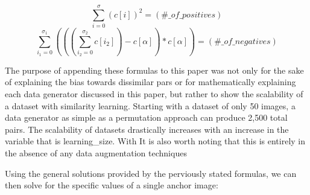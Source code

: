 \documentclass[
	letterpaper, %
	10pt, %
	unnumberedsections, %
	twoside, %
]{LTJournalArticle}
\begin{document}
\[ \sum_{i = 0}^\sigma (c[i])^2 = (\#\_of\_positives) \]
\[ \sum_{i_1 = 0}^{\sigma_1}(((\sum_{i_2 = 0}^{\sigma_2} c[i_2]) - c[\alpha]) * c[\alpha]) = (\#\_of\_negatives) \]


The purpose of appending these formulas to this paper was not only for the sake of explaining the bias towards dissimilar pars or for mathematically explaining each data generator discussed in this paper, but rather to show the scalability of a dataset with similarity learning. Starting with a dataset of only 50 images, a data generator as simple as a permutation approach can produce 2,500 total pairs.
The scalability of datasets drastically increases with an increase in the variable that is learning\_size. With 
It is also worth noting that this is entirely in the absence of any data augmentation techniques













Using the general solutions provided by the perviously stated formulas, we can then solve for the specific values of a single anchor image:
\end{document}
